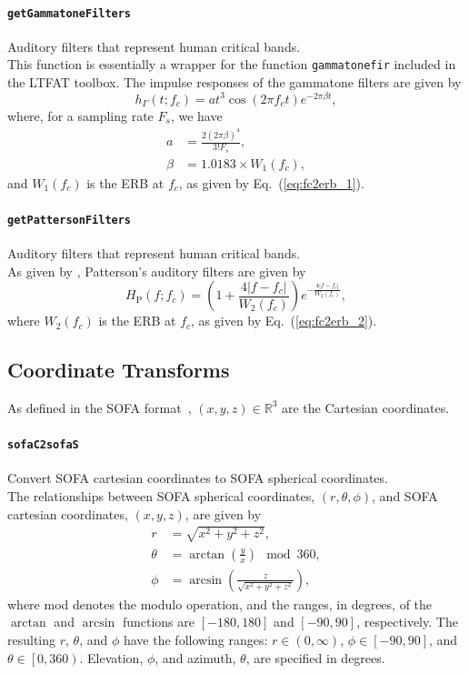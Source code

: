 \documentclass[11pt, oneside]{article}
\newcommand{\eqnref}[1]{Eq.~(\ref{#1})}
\newcommand{\function}[1]{\paragraph*{\texttt{#1}}}
\begin{document}
\function{getGammatoneFilters} Auditory filters that represent human critical bands. \\
This function is essentially a wrapper for the function \texttt{gammatonefir} included in the LTFAT toolbox.
The impulse responses of the gammatone filters are given by
\begin{equation}
h_\Gamma(t;f_c) = a t^3 \cos(2 \pi f_c t) e^{-2 \pi \beta t},
\end{equation}
where, for a sampling rate $F_s$, we have
\begin{equation}
\begin{aligned}
a &= \frac{2 (2 \pi \beta)^4}{3! F_s}, \\
\beta &= 1.0183 \times W_1(f_c),
\end{aligned}
\end{equation}
and $W_1(f_c)$ is the ERB at $f_c$, as given by \eqnref{eq:fc2erb_1}.

\function{getPattersonFilters} Auditory filters that represent human critical bands. \\
As given by \citet[Eq.~(5.9)]{Salomons1995PhD}, Patterson's auditory filters are given by
\begin{equation}
H_\text{P}(f;f_c) = \left( 1 + \frac{4|f-f_c|}{W_2(f_c)} \right) e^{-\frac{4|f-f_c|}{W_2(f_c)}},
\end{equation}
where $W_2(f_c)$ is the ERB at $f_c$, as given by \eqnref{eq:fc2erb_2}.



\subsection{Coordinate Transforms}

As defined in the SOFA format~\citep{AES69-2015}, $(x,y,z) \in \mathbb{R}^3$ are the Cartesian coordinates.
\function{sofaC2sofaS} Convert SOFA cartesian coordinates to SOFA spherical coordinates. \\
The relationships between SOFA spherical coordinates, $\left(r,\theta,\phi\right)$, and SOFA cartesian coordinates, $\left(x,y,z\right)$, are given by
\begin{align}
r &= \sqrt{x^2 + y^2 + z^2}, \\
\theta &= \arctan \left(\frac{y}{x}\right) \mod 360, \\
\phi &= \arcsin \left(\frac{z}{\sqrt{x^2 + y^2 + z^2}}\right),
\end{align}
where mod denotes the modulo operation, and the ranges, in degrees, of the $\arctan$ and $\arcsin$ functions are $\left[-180,180\right]$ and $\left[-90,90\right]$, respectively.
The resulting $r$, $\theta$, and $\phi$ have the following ranges: $r \in (0,\infty)$, $\phi \in \left[-90,90\right]$, and $\theta \in \left[0,360\right)$.
Elevation, $\phi$, and azimuth, $\theta$, are specified in degrees.
\end{document}

